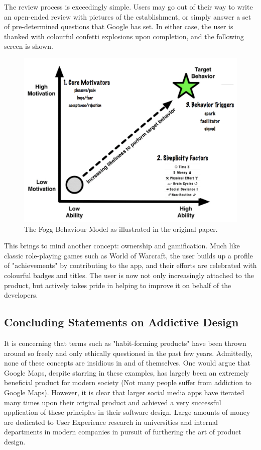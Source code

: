 The review process is exceedingly simple. Users may go out of their way to write an open-ended review with pictures of the establishment, or simply answer a set of pre-determined questions that Google has set. In either case, the user is thanked with colourful confetti explosions upon completion, and the following screen is shown.

\begin{figure}[h]
    \begin{center}
        \includegraphics[scale=0.3]{images/fogg_behaviour.png}
    \end{center}
    \caption{The Fogg Behaviour Model as illustrated in the original paper.}
    \label{fig:fogg_behaviour}
\end{figure}

This brings to mind another concept: ownership and gamification. Much like classic role-playing games such as World of Warcraft, the user builds up a profile of "achievements" by contributing to the app, and their efforts are celebrated with colourful badges and titles. The user is now not only increasingly attached to the product, but actively takes pride in helping to improve it on behalf of the developers.

\subsection{Concluding Statements on Addictive Design}
It is concerning that terms such as "habit-forming products" have been thrown around so freely and only ethically questioned in the past few years. Admittedly, none of these concepts are insidious in and of themselves. One would argue that Google Maps, despite starring in these examples, has largely been an extremely beneficial product for modern society (Not many people suffer from addiction to Google Maps). However, it is clear that larger social media apps have iterated many times upon their original product and achieved a very successful application of these principles in their software design. Large amounts of money are dedicated to User Experience research in universities and internal departments in modern companies in pursuit of furthering the art of product design.

